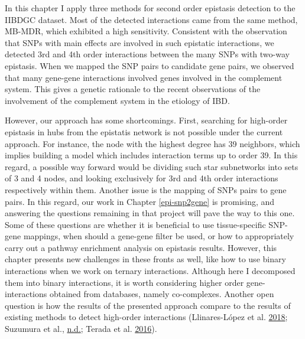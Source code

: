 \documentclass[
  11pt,
]{env/yjiao}
\begin{document}
In this chapter I apply three methods for second order epistasis detection to the IIBDGC dataset. Most of the detected interactions came from the same method, MB-MDR, which exhibited a high sensitivity. Consistent with the observation that SNPs with main effects are involved in such epistatic interactions, we detected 3rd and 4th order interactions between the many SNPs with two-way epistasis. When we mapped the SNP pairs to candidate gene pairs, we observed that many gene-gene interactions involved genes involved in the complement system. This gives a genetic rationale to the recent observations of the involvement of the complement system in the etiology of IBD.

However, our approach has some shortcomings. First, searching for high-order epistasis in hubs from the epistatis network is not possible under the current approach. For instance, the node with the highest degree has 39 neighbors, which implies building a model which includes interaction terms up to order 39. In this regard, a possible way forward would be dividing such star subnetworks into sets of 3 and 4 nodes, and looking exclusively for 3rd and 4th order interactions respectively within them. Another issue is the mapping of SNPs pairs to gene pairs. In this regard, our work in Chapter \ref{epi-snp2gene} is promising, and answering the questions remaining in that project will pave the way to this one. Some of these questions are whether it is beneficial to use tissue-specific SNP-gene mappings, when should a gene-gene filter be used, or how to appropriately carry out a pathway enrichment analysis on epistasis results. However, this chapter presents new challenges in these fronts as well, like how to use binary interactions when we work on ternary interactions. Although here I decomposed them into binary interactions, it is worth considering higher order gene-interactions obtained from databases, namely co-complexes. Another open question is how the results of the presented approach compare to the results of existing methods to detect high-order interactions (Llinares-López et al. \protect\hyperlink{ref-llinares-lopez_casmap_2018}{2018}; Suzumura et al., \protect\hyperlink{ref-suzumura_selective_nodate}{n.d.}; Terada et al. \protect\hyperlink{ref-terada_lamplink_2016}{2016}).
\end{document}

